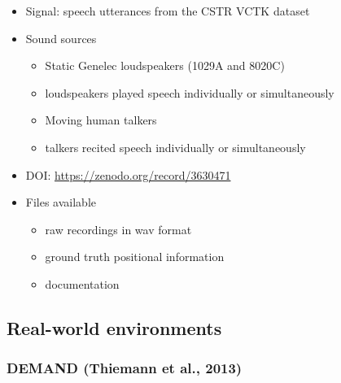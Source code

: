 \documentclass[14pt, oneside]{extarticle}
\begin{document}
\begin{itemize}
\item Signal: speech utterances from the CSTR VCTK dataset

\item Sound sources
	\begin{itemize}
	\item Static Genelec loudspeakers (1029A and 8020C)
	\item loudspeakers played speech individually or simultaneously
	\item Moving human talkers
	\item talkers recited speech individually or simultaneously
	\end{itemize}

\item DOI: \href{10.5281/zenodo.3630471}{https://zenodo.org/record/3630471} 

\item Files available
	\begin{itemize}
	\item raw recordings in wav format
	\item ground truth positional information
	\item documentation
	\end{itemize}

\end{itemize}

\subsection{Real-world environments}

\subsubsection{DEMAND (Thiemann et al., 2013)}
\end{document}
